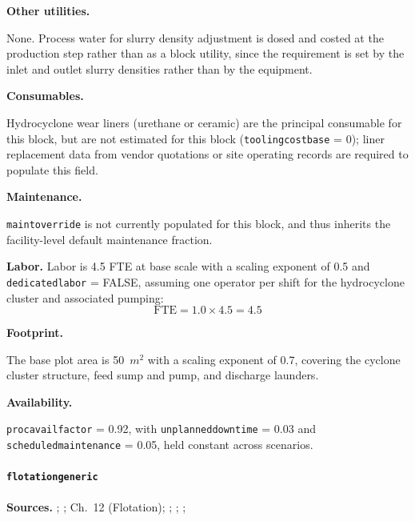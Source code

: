 \documentclass{article}
\renewcommand\_{\textunderscore\allowbreak}
\begin{document}
\medskip
\noindent\textbf{Other utilities.}\quad

None. Process water for slurry density adjustment is dosed and costed at the production step rather than as a block utility, since the requirement is set by the inlet and outlet slurry densities rather than by the equipment.


\medskip
\noindent\textbf{Consumables.}\quad

Hydrocyclone wear liners (urethane or ceramic) are the principal consumable for this block, but are not estimated for this block (\texttt{tooling\_cost\_base} = 0); liner replacement data from vendor quotations or site operating records are required to populate this field.


\medskip
\noindent\textbf{Maintenance.}\quad

\texttt{maint\_override} is not currently populated for this block, and thus inherits the facility-level default maintenance fraction.


\medskip
\noindent\textbf{Labor.}\quad
Labor is 4.5 FTE at base scale with a scaling exponent of 0.5 and \texttt{dedicated\_labor} = FALSE, assuming one operator per shift for the hydrocyclone cluster and associated pumping:
\[
	\text{FTE} = 1.0 \times 4.5 = 4.5
\]

\medskip
\noindent\textbf{Footprint.}\quad

The base plot area is 50~$\si{m^2}$ with a scaling exponent of 0.7, covering the cyclone cluster structure, feed sump and pump, and discharge launders.

\medskip
\noindent\textbf{Availability.}\quad

\texttt{proc\_avail\_factor} = 0.92, with \texttt{unplanned\_downtime} = 0.03 and \texttt{scheduled\_maintenance} = 0.05, held constant across scenarios.

\clearpage
\paragraph{\texttt{flotation\_generic}}\label{app:04-methods-blockdefs-flotation}\leavevmode\par
 
\medskip
\noindent\textbf{Sources.}\quad
\citet{jiaoKeyTechnologiesDevelopment2024}; \citet{garrettHandbookLithiumNatural2004}; \citet{darlingSMEMiningEngineering2011} Ch.~12 (Flotation); \citet{metso:outotecBasicsMineralsProcessing2024}; \citet{ausimmMonograph27Cost}; \citet{petersPlantDesignEconomics1991}; \citet{zhangInnovativeRecoveryLepidolite2025}
 
\end{document}
